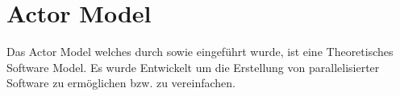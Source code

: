 \chapter{Actor Model}
Das Actor Model welches durch \cite{hewitt1973session} sowie \cite{Agha1985Actors:Systems.} eingeführt wurde, ist eine Theoretisches Software Model. Es wurde Entwickelt um die Erstellung von parallelisierter Software zu ermöglichen bzw. zu vereinfachen. 